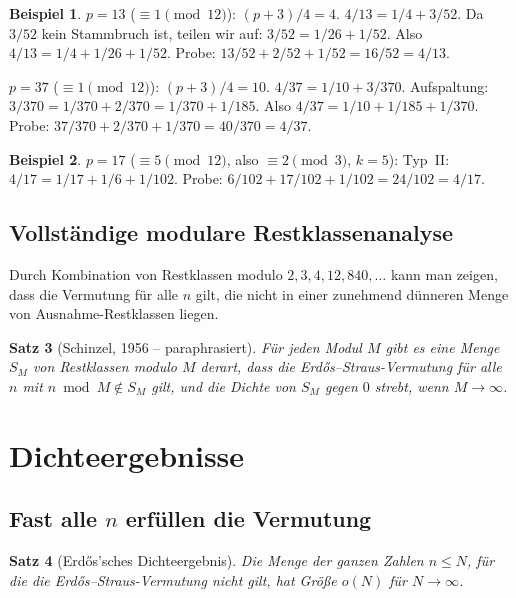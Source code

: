 \documentclass[12pt,a4paper]{amsart}
\newtheorem{theorem}{Satz}[section]
\theoremstyle{definition}
\newtheorem{example}[theorem]{Beispiel}
\begin{document}
\begin{example}
$p = 13$ ($\equiv 1 \pmod{12}$): $(p+3)/4 = 4$.
$4/13 = 1/4 + 3/52$. Da $3/52$ kein Stammbruch ist, teilen wir auf:
$3/52 = 1/26 + 1/52$.
Also $4/13 = 1/4 + 1/26 + 1/52$.
Probe: $13/52 + 2/52 + 1/52 = 16/52 = 4/13$. \checkmark

$p = 37$ ($\equiv 1 \pmod{12}$): $(p+3)/4 = 10$.
$4/37 = 1/10 + 3/370$. Aufspaltung: $3/370 = 1/370 + 2/370 = 1/370 + 1/185$.
Also $4/37 = 1/10 + 1/185 + 1/370$.
Probe: $37/370 + 2/370 + 1/370 = 40/370 = 4/37$. \checkmark
\end{example}

\begin{example}
$p = 17$ ($\equiv 5 \pmod{12}$, also $\equiv 2 \pmod 3$, $k = 5$):
Typ~II: $4/17 = 1/17 + 1/6 + 1/102$.
Probe: $6/102 + 17/102 + 1/102 = 24/102 = 4/17$. \checkmark
\end{example}

\subsection{Vollständige modulare Restklassenanalyse}

Durch Kombination von Restklassen modulo $2, 3, 4, 12, 840, \ldots$
kann man zeigen, dass die Vermutung für alle $n$ gilt, die nicht in einer
zunehmend dünneren Menge von Ausnahme-Restklassen liegen.

\begin{theorem}[Schinzel, 1956 -- paraphrasiert]\label{satz:schinzel}
Für jeden Modul $M$ gibt es eine Menge $S_M$ von Restklassen modulo $M$
derart, dass die Erd\H{o}s--Straus-Vermutung für alle $n$ mit
$n \bmod M \notin S_M$ gilt, und die Dichte von $S_M$ gegen $0$
strebt, wenn $M \to \infty$.
\end{theorem}

\section{Dichteergebnisse}

\subsection{Fast alle $n$ erfüllen die Vermutung}

\begin{theorem}[Erd\H{o}s'sches Dichteergebnis]\label{satz:dichte}
Die Menge der ganzen Zahlen $n \leq N$, für die die
Erd\H{o}s--Straus-Vermutung \emph{nicht gilt}, hat Größe $o(N)$
für $N \to \infty$.
\end{theorem}
\end{document}

